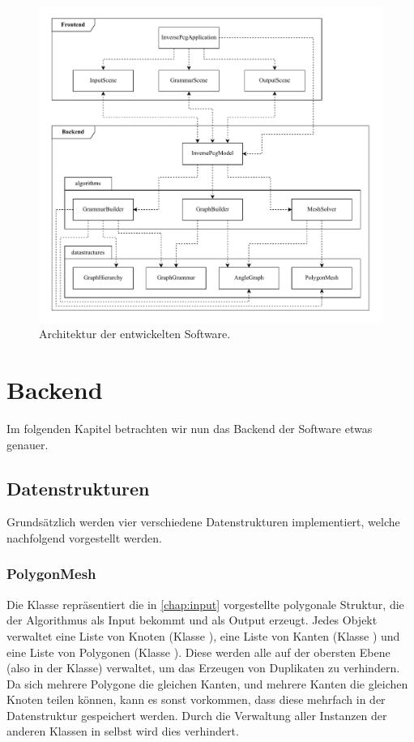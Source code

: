 \begin{figure}[h]
    \centering
    \includegraphics[width=\textwidth]{images/architecture.pdf}
    \caption{Architektur der entwickelten Software.}
    \label{fig:architecture}
\end{figure}


\section{Backend}
Im folgenden Kapitel betrachten wir nun das Backend der Software etwas genauer.

\subsection{Datenstrukturen}
Grundsätzlich werden vier verschiedene Datenstrukturen implementiert, welche nachfolgend vorgestellt werden.

\subsubsection{PolygonMesh}
Die  Klasse repräsentiert die in \autoref{chap:input} vorgestellte polygonale Struktur, die der Algorithmus
als Input bekommt und als Output erzeugt. Jedes  Objekt verwaltet eine Liste von Knoten (Klasse ),
eine Liste von Kanten (Klasse ) und eine Liste von Polygonen (Klasse ). Diese werden alle auf der
obersten Ebene (also in der  Klasse) verwaltet, um das Erzeugen von Duplikaten zu verhindern. Da sich
mehrere Polygone die gleichen Kanten, und mehrere Kanten die gleichen Knoten teilen können, kann es sonst vorkommen, dass diese mehrfach
in der Datenstruktur gespeichert werden. Durch die Verwaltung aller Instanzen der anderen Klassen in  selbst wird
dies verhindert.

